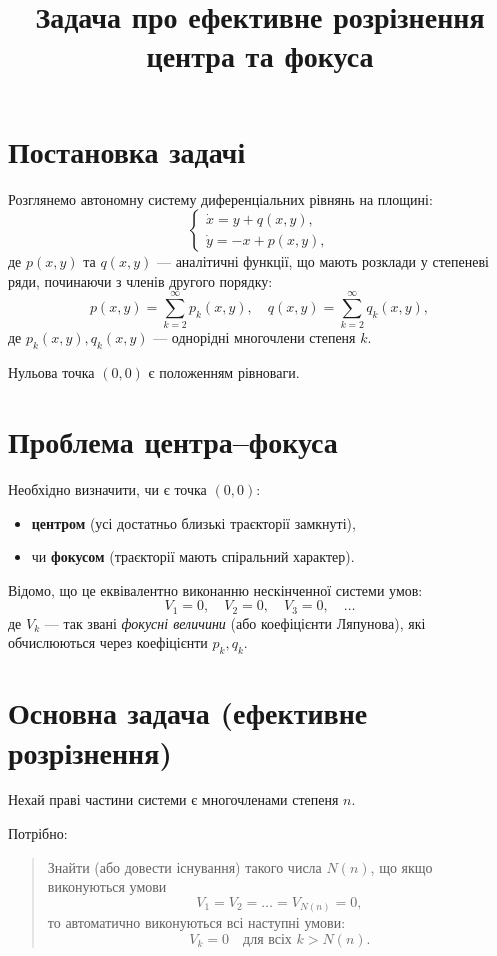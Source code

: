 \documentclass[a4paper,12pt]{article}
\title{Задача про ефективне розрізнення центра та фокуса}
\author{}
\date{}
\begin{document}
\maketitle

\section*{Постановка задачі}

Розглянемо автономну систему диференціальних рівнянь на площині:
\begin{equation}
\begin{cases}
\dot{x} = y + q(x,y), \\
\dot{y} = -x + p(x,y),
\end{cases}
\end{equation}
де $p(x,y)$ та $q(x,y)$ --- аналітичні функції, що мають розклади у степеневі ряди, починаючи з членів другого порядку:
\[
p(x,y) = \sum_{k=2}^{\infty} p_k(x,y), \quad
q(x,y) = \sum_{k=2}^{\infty} q_k(x,y),
\]
де $p_k(x,y), q_k(x,y)$ --- однорідні многочлени степеня $k$.

Нульова точка $(0,0)$ є положенням рівноваги.

\section*{Проблема центра--фокуса}

Необхідно визначити, чи є точка $(0,0)$:
\begin{itemize}
\item \textbf{центром} (усі достатньо близькі траєкторії замкнуті),
\item чи \textbf{фокусом} (траєкторії мають спіральний характер).
\end{itemize}

Відомо, що це еквівалентно виконанню нескінченної системи умов:
\[
V_1 = 0, \quad V_2 = 0, \quad V_3 = 0, \quad \dots
\]
де $V_k$ --- так звані \textit{фокусні величини} (або коефіцієнти Ляпунова), які обчислюються через коефіцієнти $p_k, q_k$.

\section*{Основна задача (ефективне розрізнення)}

Нехай праві частини системи є многочленами степеня $n$.

Потрібно:

\begin{quote}
Знайти (або довести існування) такого числа $N(n)$, що якщо виконуються умови
\[
V_1 = V_2 = \dots = V_{N(n)} = 0,
\]
то автоматично виконуються всі наступні умови:
\[
V_k = 0 \quad \text{для всіх } k > N(n).
\]
\end{quote}
\end{document}
